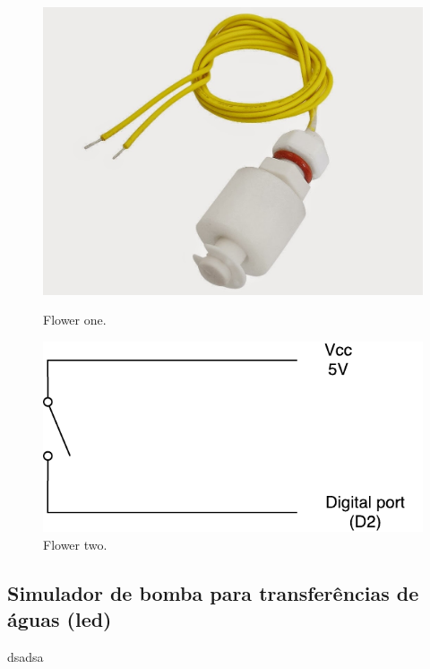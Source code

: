 \begin{figure}[h]
	\centering
	\begin{minipage}[b]{0.4\textwidth}
		\includegraphics[width=\textwidth]{img/hardware/liquido.JPG}
		\caption{Flower one.}
	\end{minipage}
	\hfill
	\begin{minipage}[b]{0.4\textwidth}
		\includegraphics[width=\textwidth]{img/hardware/sw_esquema.pdf}
		\caption{Flower two.}
	\end{minipage}
\end{figure}




\subsection{Simulador de bomba para transferências de águas (led)}


dsadsa

